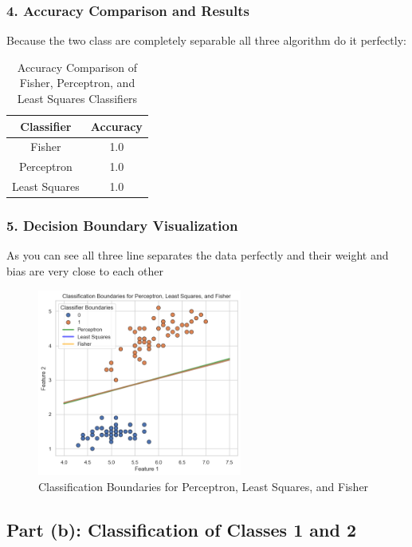 \documentclass[a4paper, 11pt]{article}
\begin{document}
	\subsubsection*{4. Accuracy Comparison and Results}
	
	Because the two class are completely separable all three algorithm do it perfectly:
	
	\begin{table}[h!]
		\centering
		\begin{tabular}{|c|c|}
			\hline
			\textbf{Classifier} & \textbf{Accuracy} \\
			\hline
			Fisher & 1.0 \\
			Perceptron & 1.0 \\
			Least Squares & 1.0 \\
			\hline
		\end{tabular}
		\caption{Accuracy Comparison of Fisher, Perceptron, and Least Squares Classifiers}
	\end{table}
	
	\subsubsection*{5. Decision Boundary Visualization}
	
	As you can see all three line separates the data perfectly and their weight and bias
	are very close to each other
	
	\begin{figure}[h!]
		\centering
		\includegraphics[width=0.6\textwidth]{images/q4_a.png}
		\caption{Classification Boundaries for Perceptron, Least Squares, and Fisher}
		\label{fig:decision_boundary}
	\end{figure}
	
	\newpage
	\subsection*{Part (b): Classification of Classes 1 and 2}
	
\end{document}
